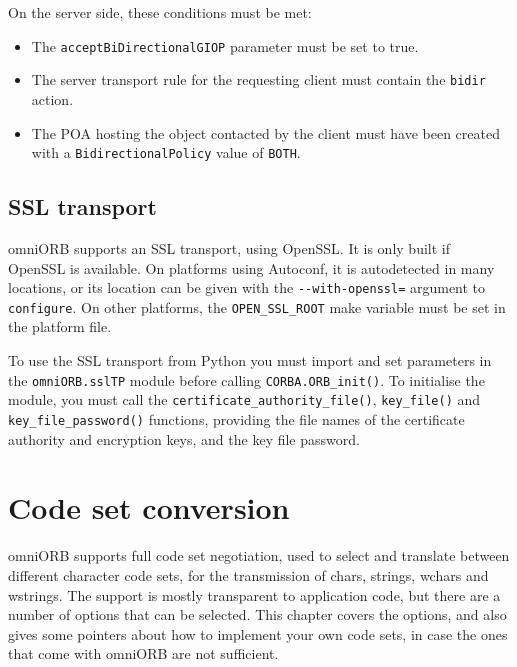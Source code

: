 \documentclass[11pt,twoside,a4paper]{book}
\newcommand{\code}[1]{\texttt{#1}}
\newcommand{\op}[1]{\texttt{#1()}}
\begin{document}
\noindent On the server side, these conditions must be met:

\begin{itemize}

\item The \code{acceptBiDirectionalGIOP} parameter must be set to true. 
\item The server transport rule for the requesting client must contain
      the \code{bidir} action.
\item The POA hosting the object contacted by the client must have
      been created with a \code{BidirectionalPolicy} value of
      \code{BOTH}.

\end{itemize}


\section{SSL transport}

omniORB supports an SSL transport, using OpenSSL. It is only built if
OpenSSL is available. On platforms using Autoconf, it is autodetected
in many locations, or its location can be given with the
\code{-{}-with-openssl=} argument to \code{configure}. On other
platforms, the \code{OPEN\_SSL\_ROOT} make variable must be set in the
platform file.

To use the SSL transport from Python you must import and set
parameters in the \code{omniORB.sslTP} module before calling
\op{CORBA.ORB\_init}. To initialise the module, you must call the
\op{certificate\_authority\_file}, \op{key\_file} and
\op{key\_file\_password} functions, providing the file names of the
certificate authority and encryption keys, and the key file password.






\chapter{Code set conversion}
\label{chap:codesets}

omniORB supports full code set negotiation, used to select and
translate between different character code sets, for the transmission
of chars, strings, wchars and wstrings. The support is mostly
transparent to application code, but there are a number of options
that can be selected. This chapter covers the options, and also gives
some pointers about how to implement your own code sets, in case the
ones that come with omniORB are not sufficient.
\end{document}
